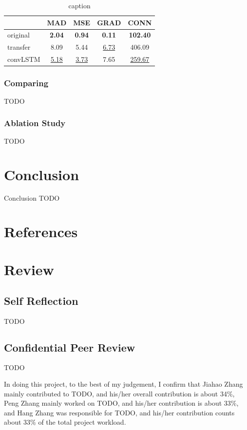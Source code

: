 \documentclass[final]{cvpr}
\begin{document}
\begin{table}
    \centering
    \caption{caption}
    \label{result}
    \begin{tabular}{lcccc}
        \toprule
        {}       & MAD              & MSE              & GRAD             & CONN               \\
        \midrule
        original & \textbf{2.04}    & \textbf{0.94}    & \textbf{0.11}    & \textbf{102.40}    \\
        \midrule
        transfer & 8.09             & 5.44             & \underline{6.73} & 406.09             \\
        convLSTM & \underline{5.18} & \underline{3.73} & 7.65             & \underline{259.67} \\
        \bottomrule
    \end{tabular}
\end{table}

\subsubsection{Comparing}

TODO

\subsubsection{Ablation Study}

TODO

\section{Conclusion}

Conclusion TODO

\cite{chenRethinkingAtrousConvolution2017}

\section{References}




\section{Review}

\subsection{Self Reflection}

TODO

\subsection{Confidential Peer Review}

TODO

In doing this project, to the best of my judgement,
I confirm that Jiahao Zhang mainly contributed to TODO,
and his/her overall contribution is about 34\%,
Peng Zhang mainly worked on TODO,
and his/her contribution is about 33\%,
and Hang Zhang was responsible for TODO,
and his/her contribution counts about 33\% of the total project workload.
\end{document}

